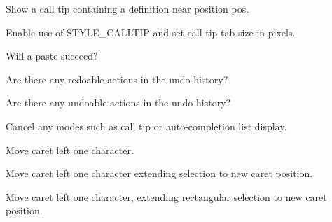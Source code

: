 Show a call tip containing a definition near position pos.


\label{wxstyledtextctrlcalltipusestyle}


Enable use of STYLE\_CALLTIP and set call tip tab size in pixels.


\label{wxstyledtextctrlcanpaste}


Will a paste succeed?


\label{wxstyledtextctrlcanredo}


Are there any redoable actions in the undo history?


\label{wxstyledtextctrlcanundo}


Are there any undoable actions in the undo history?


\label{wxstyledtextctrlcancel}


Cancel any modes such as call tip or auto-completion list display.


\label{wxstyledtextctrlcharleft}


Move caret left one character.


\label{wxstyledtextctrlcharleftextend}


Move caret left one character extending selection to new caret position.


\label{wxstyledtextctrlcharleftrectextend}


Move caret left one character, extending rectangular selection to new caret position.


\label{wxstyledtextctrlcharright}


